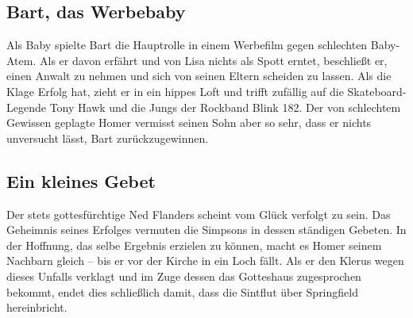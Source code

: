 \subsection{Bart, das Werbebaby}
Als Baby spielte Bart die Hauptrolle in einem Werbefilm gegen schlechten Baby-Atem. Als er davon erfährt und von Lisa nichts als Spott erntet, beschließt er, einen Anwalt zu nehmen und sich von seinen Eltern scheiden zu lassen. Als die Klage Erfolg hat, zieht er in ein hippes Loft und trifft zufällig auf die Skateboard-Legende Tony Hawk und die Jungs der Rockband Blink 182. Der von schlechtem Gewissen geplagte Homer vermisst seinen Sohn aber so sehr, dass er nichts unversucht lässt, Bart zurückzugewinnen.


\subsection{Ein kleines Gebet}\label{EABF06}
Der stets gottesfürchtige Ned Flanders scheint vom Glück verfolgt zu sein. Das Geheimnis seines Erfolges vermuten die Simpsons in dessen ständigen Gebeten. In der Hoffnung, das selbe Ergebnis erzielen zu können, macht es Homer seinem Nachbarn gleich -- bis er vor der Kirche in ein Loch fällt. Als er den Klerus wegen dieses Unfalls verklagt und im Zuge dessen das Gotteshaus zugesprochen bekommt, endet dies schließlich damit, dass die Sintflut über Springfield hereinbricht.


